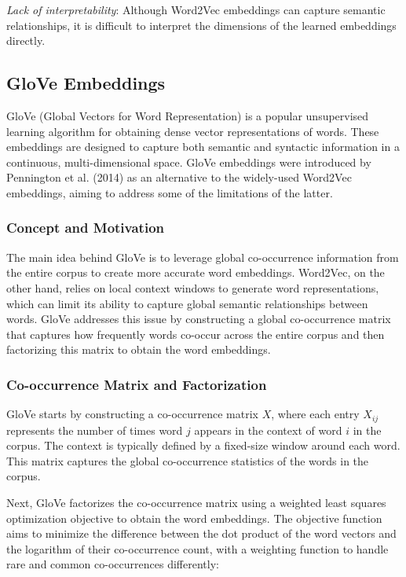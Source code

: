 \documentclass[12pt]{article}
\begin{document}
\textit{Lack of interpretability}: Although Word2Vec embeddings can capture semantic relationships, it is difficult to interpret the dimensions of the learned embeddings directly.

\subsection{GloVe Embeddings}

GloVe (Global Vectors for Word Representation) is a popular unsupervised learning algorithm for obtaining dense vector representations of words. These embeddings are designed to capture both semantic and syntactic information in a continuous, multi-dimensional space. GloVe embeddings were introduced by Pennington et al. (2014) as an alternative to the widely-used Word2Vec embeddings, aiming to address some of the limitations of the latter.

\subsubsection{Concept and Motivation}

The main idea behind GloVe is to leverage global co-occurrence information from the entire corpus to create more accurate word embeddings. Word2Vec, on the other hand, relies on local context windows to generate word representations, which can limit its ability to capture global semantic relationships between words. GloVe addresses this issue by constructing a global co-occurrence matrix that captures how frequently words co-occur across the entire corpus and then factorizing this matrix to obtain the word embeddings.

\subsubsection{Co-occurrence Matrix and Factorization}

GloVe starts by constructing a co-occurrence matrix $X$, where each entry $X_{ij}$ represents the number of times word $j$ appears in the context of word $i$ in the corpus. The context is typically defined by a fixed-size window around each word. This matrix captures the global co-occurrence statistics of the words in the corpus.

Next, GloVe factorizes the co-occurrence matrix using a weighted least squares optimization objective to obtain the word embeddings. The objective function aims to minimize the difference between the dot product of the word vectors and the logarithm of their co-occurrence count, with a weighting function to handle rare and common co-occurrences differently:
\end{document}
